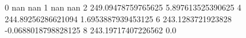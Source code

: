 0 nan nan
1 nan nan
2 249.09478759765625 5.897613525390625
4 244.89256286621094 1.6953887939453125
6 243.1283721923828 -0.0688018798828125
8 243.19717407226562 0.0
